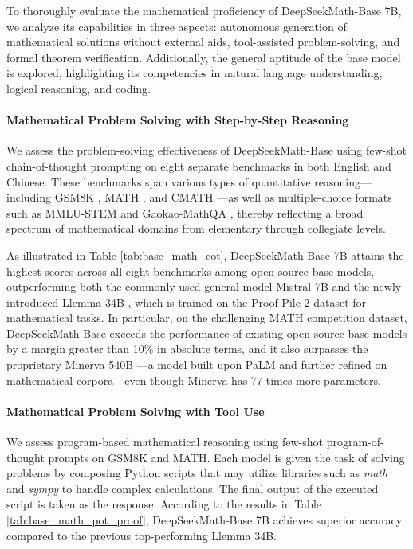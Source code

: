 To thoroughly evaluate the mathematical proficiency of DeepSeekMath-Base 7B, we analyze its capabilities in three aspects: autonomous generation of mathematical solutions without external aids, tool-assisted problem-solving, and formal theorem verification. Additionally, the general aptitude of the base model is explored, highlighting its competencies in natural language understanding, logical reasoning, and coding.

\paragraph{Mathematical Problem Solving with Step-by-Step Reasoning}

We assess the problem-solving effectiveness of DeepSeekMath-Base using few-shot chain-of-thought prompting \citep{cot} on eight separate benchmarks in both English and Chinese. These benchmarks span various types of quantitative reasoning—including GSM8K \citep{gsm8k}, MATH \citep{MATH}, and CMATH \citep{wei2023cmath}—as well as multiple-choice formats such as MMLU-STEM \citep{mmlu} and Gaokao-MathQA \citep{agieval}, thereby reflecting a broad spectrum of mathematical domains from elementary through collegiate levels.

As illustrated in Table \ref{tab:base_math_cot}, DeepSeekMath-Base 7B attains the highest scores across all eight benchmarks among open-source base models, outperforming both the commonly used general model Mistral 7B \citep{mistral} and the newly introduced Llemma 34B \citep{llemma}, which is trained on the Proof-Pile-2 dataset \citep{llemma} for mathematical tasks. In particular, on the challenging MATH competition dataset, DeepSeekMath-Base exceeds the performance of existing open-source base models by a margin greater than 10\% in absolute terms, and it also surpasses the proprietary Minerva 540B \citep{minerva}—a model built upon PaLM \citep{palm} and further refined on mathematical corpora—even though Minerva has 77 times more parameters.

\paragraph{Mathematical Problem Solving with Tool Use} We assess program-based mathematical reasoning using few-shot program-of-thought prompts \citep{pot,pal} on GSM8K and MATH. Each model is given the task of solving problems by composing Python scripts that may utilize libraries such as \textit{math} and \textit{sympy} to handle complex calculations. The final output of the executed script is taken as the response. According to the results in Table \ref{tab:base_math_pot_proof}, DeepSeekMath-Base 7B achieves superior accuracy compared to the previous top-performing Llemma 34B.

